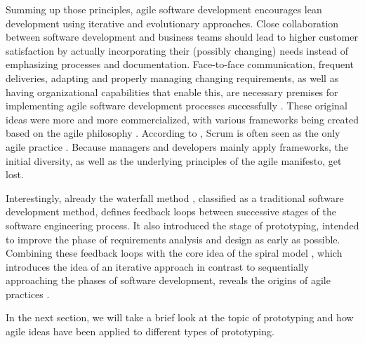 Summing up those principles, agile software development encourages lean development using iterative and evolutionary approaches.
Close collaboration between software development and business teams should lead to higher customer satisfaction by actually incorporating their (possibly changing) needs instead of emphasizing processes and documentation.
Face-to-face communication, frequent deliveries, adapting and properly managing changing requirements, as well as having organizational capabilities that enable this, are necessary premises for implementing agile software development processes successfully \cite{misra_agile_2012}.
These original ideas were more and more commercialized, with various frameworks being created based on the agile philosophy \cite{hohl_back_2018}.
According to \citeauthor{hohl_back_2018}, Scrum is often seen as the only agile practice \cite{hohl_back_2018}.
Because managers and developers mainly apply frameworks, the initial diversity, as well as the underlying principles of the agile manifesto, get lost.



Interestingly, already the waterfall method \cite{royce_managing_1987}, classified as a traditional software development method, defines feedback loops between successive stages of the software engineering process.
It also introduced the stage of prototyping, intended to improve the phase of requirements analysis and design as early as possible.
Combining these feedback loops with the core idea of the spiral model \cite{boehm_spiral_1988}, which introduces the idea of an iterative approach in contrast to sequentially approaching the phases of software development, reveals the origins of agile practices \cite{misra_agile_2012}.

In the next section, we will take a brief look at the topic of prototyping and how agile ideas have been applied to different types of prototyping.



